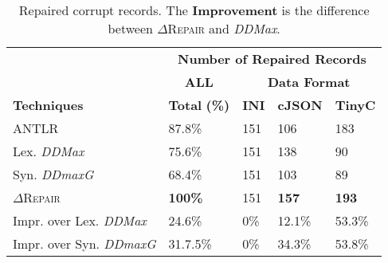 \documentclass[acmsmall,screen,review,anonymous]{acmart}
\newcommand{\formatfree}{format-free\xspace}
\newcommand{\dtask}{data repair\xspace}
\newcommand{\approach}{\textsc{$\Delta$Repair}\xspace}
\newcommand{\ANTLR}{ANTLR\xspace}
\newcommand{\ddmax}{\textit{DDMax}\xspace}
\newcommand{\ddmaxg}{\textit{DDmaxG}\xspace}
\newcommand{\drepair}{\approach}
\begin{document}
%

\begin{table}[!tbp]
\centering
  \caption{Repaired corrupt records. The \textbf{Improvement} is the difference between \drepair and \ddmax.}
\begin{tabular}{|p{4.0cm}|p{1.5cm}|p{1.5cm}|p{1.5cm}|p{1.5cm}|}
\hline
&  \multicolumn{4}{c|}{\textbf{Number of Repaired Records}}  \\
&  \multicolumn{1}{c|}{\textbf{ALL}} & \multicolumn{3}{c|}{\textbf{Data Format}}  \\
\textbf{Techniques} & \textbf{Total} \textbf{(\%)} & \textbf{INI} & \textbf{cJSON} & \textbf{TinyC} \\
\hline
  \ANTLR & 87.8\% & 151 & 106 & 183   \\
  Lex. \ddmax & 75.6\% & 151  & 138 & 90  \\
  Syn. \ddmaxg & 68.4\% & 151  & 103  & 89  \\ 	
\approach  & \textbf{100\%} & 151 & \textbf{157}  & \textbf{193} \\
\hline
Impr. over Lex. \ddmax &  24.6\%  & 0\% & 12.1\% & 53.3\% \\
Impr. over Syn. \ddmaxg &  31.7.5\%  & 0\% & 34.3\% & 53.8\% \\
\hline
\end{tabular}
\label{tab:effectiveness}
\end{table}

%
\end{document}
